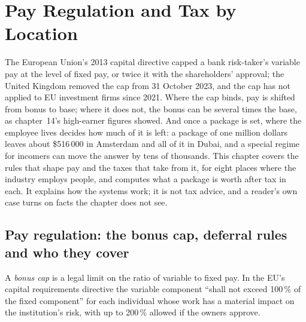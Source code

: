 \chapter{Pay Regulation and Tax by Location}\label{ch:in:pay-regulation-and-tax-by-location}

The European Union's 2013 capital directive capped a bank risk-taker's variable pay at the level of fixed pay, or twice
it with the shareholders' approval; the United Kingdom removed the cap from 31 October 2023, and the cap has not applied
to EU investment firms since 2021. Where the cap binds, pay is shifted from bonus to base; where it does not, the bonus
can be several times the base, as chapter~14's high-earner figures showed. And once a package is set, where the employee
lives decides how much of it is left: a package of one million dollars leaves about \$516\,000 in Amsterdam and all of it
in Dubai, and a special regime for incomers can move the answer by tens of thousands. This chapter covers the rules that
shape pay and the taxes that take from it, for eight places where the industry employs people, and computes what a
package is worth after tax in each. It explains how the systems work; it is not tax advice, and a reader's own case
turns on facts the chapter does not see.

\section{Pay regulation: the bonus cap, deferral rules and who they cover}

\begin{definition}\label{def:in:pay-regulation-and-tax-by-location:cap}
A \emph{bonus cap} is a legal limit on the ratio of variable to fixed pay. In the EU's capital
requirements directive the variable component ``shall not exceed 100\,\% of the fixed component'' for each individual
whose work has a material impact on the institution's risk, with up to 200\,\% allowed if the owners approve.
\end{definition}

